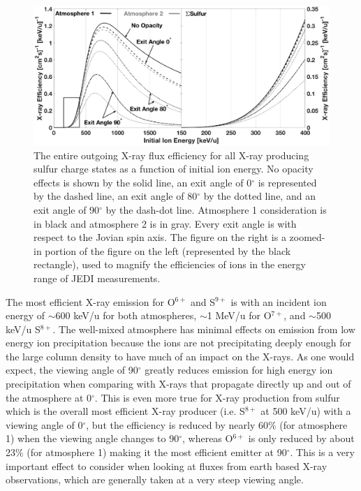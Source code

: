 \documentclass[draft]{agujournal2018}
\begin{document}
\begin{figure}[ht]
    \centering
    \includegraphics[width=\textwidth]{Figures/SulXrayEff2.eps}
    \caption{The entire outgoing X-ray flux efficiency for all X-ray producing sulfur charge states as a function of initial ion energy. No opacity effects is shown by the solid line, an exit angle of 0$^{\circ}$ is represented by the dashed line, an exit angle of 80$^{\circ}$ by the dotted line, and an exit angle of 90$^{\circ}$ by the dash-dot line. Atmosphere 1 consideration is in black and atmosphere 2 is in gray. Every exit angle is with respect to the Jovian spin axis. The figure on the right is a zoomed-in portion of the figure on the left (represented by the black rectangle), used to magnify the efficiencies of ions in the energy range of JEDI measurements.}
    \label{fig:SulXrayEff}
\end{figure}

The most efficient X-ray emission for O$^{6+}$ and S$^{9+}$ is with an incident ion energy of $\sim$600 keV/u for both atmospheres, $\sim$1 MeV/u for O$^{7+}$, and $\sim$500 keV/u S$^{8+}$.
The well-mixed atmosphere has minimal effects on emission from low energy ion precipitation because the ions are not precipitating deeply enough for the large column density to have much of an impact on the X-rays.
As one would expect, the viewing angle of 90$^{\circ}$ greatly reduces emission for high energy ion precipitation when comparing with X-rays that propagate directly up and out of the atmosphere at 0$^{\circ}$.
This is even more true for X-ray production from sulfur which is the overall most efficient X-ray producer (i.e. S$^{8+}$ at 500 keV/u) with a viewing angle of 0$^{\circ}$, but the efficiency is reduced by nearly 60$\%$ (for atmosphere 1) when the viewing angle changes to 90$^{\circ}$, whereas O$^{6+}$ is only reduced by about 23$\%$ (for atmosphere 1) making it the most efficient emitter at 90$^{\circ}$.
This is a very important effect to consider when looking at fluxes from earth based X-ray observations, which are generally taken at a very steep viewing angle.
\end{document}
